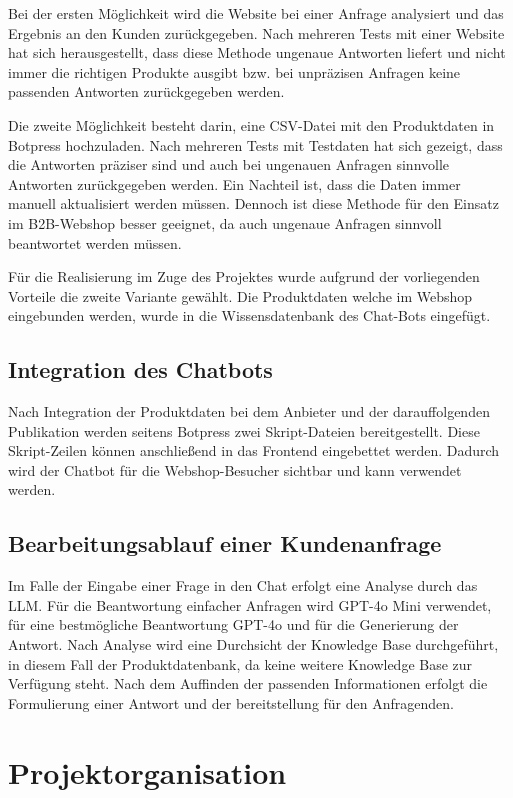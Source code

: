 \documentclass[%
	12pt,
	a4paper,
	oneside,
	parskip=full
]{scrbook}
\begin{document}
Bei der ersten Möglichkeit wird die Website bei einer Anfrage analysiert und das Ergebnis an den Kunden zurückgegeben. 
Nach mehreren Tests mit einer Website hat sich herausgestellt, dass diese Methode ungenaue Antworten liefert und nicht immer die richtigen Produkte ausgibt bzw. bei unpräzisen Anfragen keine passenden Antworten zurückgegeben werden.

Die zweite Möglichkeit besteht darin, eine CSV-Datei mit den Produktdaten in Botpress hochzuladen. 
Nach mehreren Tests mit Testdaten hat sich gezeigt, dass die Antworten präziser sind und auch bei ungenauen Anfragen sinnvolle Antworten zurückgegeben werden. 
Ein Nachteil ist, dass die Daten immer manuell aktualisiert werden müssen. 
Dennoch ist diese Methode für den Einsatz im B2B-Webshop besser geeignet, da auch ungenaue Anfragen sinnvoll beantwortet werden müssen.  

Für die Realisierung im Zuge des Projektes wurde aufgrund der vorliegenden Vorteile die zweite Variante gewählt. Die Produktdaten welche im Webshop eingebunden werden, wurde in die Wissensdatenbank des Chat-Bots eingefügt.

\section{Integration des Chatbots}
Nach Integration der Produktdaten bei dem Anbieter und der darauffolgenden Publikation werden seitens Botpress zwei Skript-Dateien bereitgestellt. Diese Skript-Zeilen können anschließend in das Frontend eingebettet werden. Dadurch wird der Chatbot für die Webshop-Besucher sichtbar und kann verwendet werden.

\section{Bearbeitungsablauf einer Kundenanfrage}
Im Falle der Eingabe einer Frage in den Chat erfolgt eine Analyse durch das LLM. Für die Beantwortung einfacher Anfragen wird GPT-4o Mini verwendet, für eine bestmögliche Beantwortung GPT-4o und für die Generierung der Antwort. Nach Analyse wird eine Durchsicht der Knowledge Base durchgeführt, in diesem Fall der Produktdatenbank, da keine weitere Knowledge Base zur Verfügung steht. Nach dem Auffinden der passenden Informationen erfolgt die Formulierung einer Antwort und der bereitstellung für den Anfragenden.


\chapter{Projektorganisation}
\end{document}
